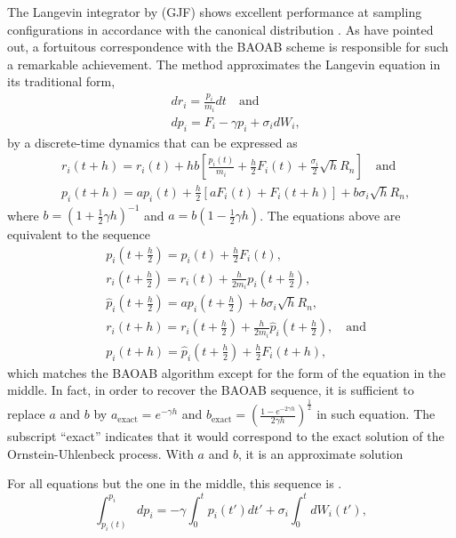 \documentclass[
aip,
jcp,
reprint,
]{revtex4-1}
\newcommand{\timestep}{h}
\begin{document}
The Langevin integrator by \citeauthor{Gronbech-jensen_2013} \cite{Gronbech-jensen_2013} (GJF) shows excellent performance at sampling configurations in accordance with the canonical distribution \cite{Jensen_2019, Finkelstein_2019}.
As \citeauthor{Li_2017} \cite{Li_2017} have pointed out, a fortuitous correspondence with the BAOAB scheme \cite{Leimkuhler_2012, Leimkuhler_2013_2} is responsible for such a remarkable achievement. 
The method approximates the Langevin equation in its traditional form,
\begin{align}
&dr_i = \frac{p_i}{m_i} dt \quad \mathrm{and} \\
&dp_i = F_i - \gamma p_i + \sigma_i dW_i,
\end{align}
by a discrete-time dynamics that can be expressed as
\begin{align}
&r_i(t+\timestep) = r_i(t) + \timestep b \left[\frac{p_i(t)}{m_i} + \frac{\timestep}{2} F_i(t) + \frac{\sigma_i}{2} \sqrt{\timestep} R_n \right] \quad \mathrm{and} \\
&p_i(t+\timestep) = a p_i(t) + \frac{\timestep}{2} \left[a F_i(t) + F_i(t+\timestep)\right] + b \sigma_i \sqrt{\timestep} R_n,
\end{align}
where $b = (1+\frac{1}{2}\gamma \timestep)^{-1}$ and $a = b (1-\frac{1}{2}\gamma \timestep)$.
The equations above are equivalent to the sequence
\begin{align}
&p_i(t+\tfrac{\timestep}{2}) = p_i(t) + \tfrac{\timestep}{2} F_i(t), \\
&r_i(t+\tfrac{\timestep}{2}) = r_i(t) + \tfrac{\timestep}{2 m_i} p_i(t+\tfrac{\timestep}{2}), \\
&\hat{p}_i(t+\tfrac{\timestep}{2}) = a p_i(t+\tfrac{\timestep}{2}) + b \sigma_i \sqrt{\timestep} R_n, \\
&r_i(t+\timestep) = r_i(t+\tfrac{\timestep}{2}) + \tfrac{\timestep}{2 m_i} \hat{p}_i(t+\tfrac{\timestep}{2}), \quad \mathrm{and} \\
&p_i(t+\timestep) = \hat{p}_i(t+\tfrac{\timestep}{2}) + \tfrac{\timestep}{2} F_i(t+\timestep),
\end{align}
which matches the BAOAB algorithm except for the form of the equation in the middle.
In fact, in order to recover the BAOAB sequence, it is sufficient to replace $a$ and $b$ by $a_\mathrm{exact} = e^{-\gamma \timestep}$ and $b_\mathrm{exact} = (\frac{1 - e^{-2 \gamma \timestep}}{2 \gamma \timestep})^\frac{1}{2}$ in such equation.
The subscript ``exact'' indicates that it would correspond to the exact solution of the Ornstein-Uhlenbeck process.
With $a$ and $b$, it is an approximate solution



For all equations but the one in the middle, this sequence is .
\begin{equation}
\int_{p_i(t)}^{p_i} dp_i = -\gamma \int_{0}^{t} p_i(t') dt' + \sigma_i \int_{0}^{t} dW_i(t'),
\end{equation}



\end{document}
